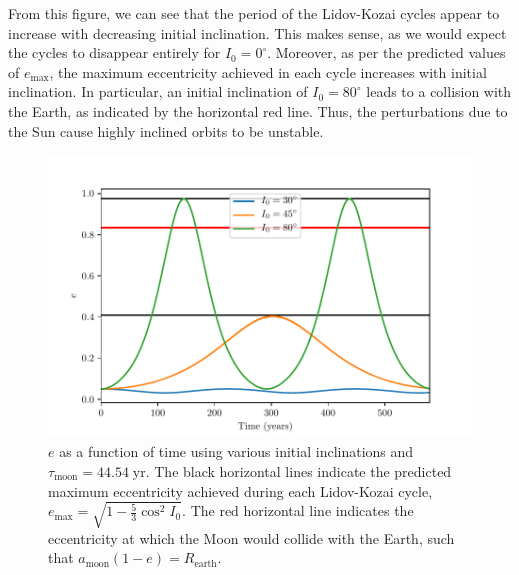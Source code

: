 \documentclass[11pt]{article}
\begin{document}
From this figure, we can see that the period of the Lidov-Kozai cycles appear to increase with decreasing initial inclination. This makes sense, as we would expect the cycles to disappear entirely for $I_0 = 0^\circ$. Moreover, as per the predicted values of $e_\mathrm{max}$, the maximum eccentricity achieved in each cycle increases with initial inclination. In particular, an initial inclination of $I_0 = 80^\circ$ leads to a collision with the Earth, as indicated by the horizontal red line. Thus, the perturbations due to the Sun cause highly inclined orbits to be unstable.

\begin{figure}[h!]
    \centering
    \includegraphics[width=\textwidth]{plots/figure3.pdf}
    \caption{$e$ as a function of time using various initial inclinations and $\tau_\mathrm{moon} = 44.54 \; \mathrm{yr}$. The black horizontal lines indicate the predicted maximum eccentricity achieved during each Lidov-Kozai cycle, $e_\mathrm{max} = \sqrt{1 - \tfrac{5}{3} \cos^2 I_0}$. The red horizontal line indicates the eccentricity at which the Moon would collide with the Earth, such that $a_\mathrm{moon}(1 - e) = R_\mathrm{earth}$.}
    \label{fig:e_max}
\end{figure}
\end{document}
